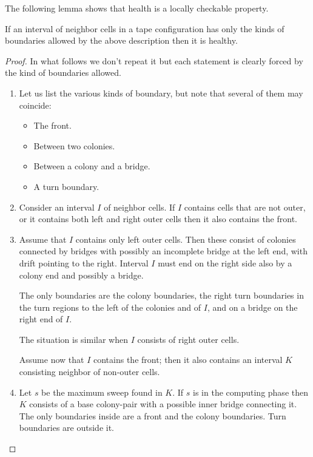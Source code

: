 \documentclass[11pt]{memoir}
\theoremstyle{definition} %
\begin{document}
The following lemma shows that health is a locally checkable property.
 
\begin{lemma}
  If an interval of neighbor cells in a tape configuration
  has only the kinds of boundaries allowed by the above description then it is healthy.
\end{lemma}
\begin{proof}
  In what follows we don't repeat it but each statement is clearly forced by the kind of boundaries
  allowed.
  \begin{enumerate}
  \item
Let us list the various kinds of boundary, but note that several of them may coincide:
\begin{itemize}
\item The front.
\item Between two colonies.
\item Between a colony and a bridge.
\item A turn boundary.
\end{itemize}

\item Consider an interval \( I \) of neighbor cells.
  If  \( I \) contains cells that are not outer, or it contains both left and right outer cells
  then it also contains the front.

\item Assume that \( I \) contains only left outer cells.
Then these consist of colonies connected by bridges with possibly an incomplete
bridge at the left end, with drift pointing to the right.
Interval \( I \) must end on the right side also by a colony end and possibly a bridge.

The only boundaries are the colony boundaries, the
right turn boundaries in the turn regions to the left of the colonies and of \( I \),
and on a bridge on the right end of \( I \).

The situation is similar when \( I \) consists of right outer cells.

Assume now that \( I \) contains the front;
then it also contains an interval \( K \) consisting neighbor of non-outer cells.
  
\item Let \( s \) be the maximum sweep found in \( K \).
  If \( s \) is in the computing phase then \( K \) consists
  of a base colony-pair with a possible inner bridge connecting it.
  The only boundaries inside are a front and the colony boundaries.
  Turn boundaries are outside it.


\end{enumerate}
\end{proof}
\end{document}
